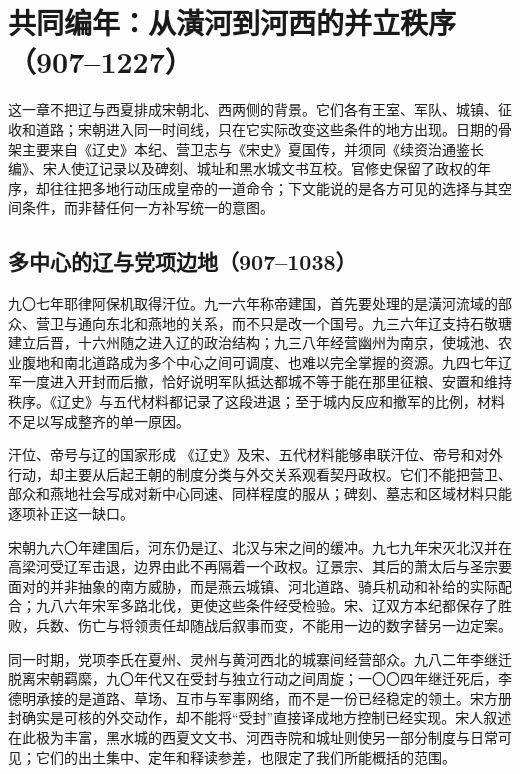 \section{共同编年：从潢河到河西的并立秩序（907--1227）}

这一章不把辽与西夏排成宋朝北、西两侧的背景。它们各有王室、军队、城镇、征收和道路；宋朝进入同一时间线，只在它实际改变这些条件的地方出现。日期的骨架主要来自《辽史》本纪、营卫志与《宋史》夏国传，并须同《续资治通鉴长编》、宋人使辽记录以及碑刻、城址和黑水城文书互校。官修史保留了政权的年序，却往往把多地行动压成皇帝的一道命令；下文能说的是各方可见的选择与其空间条件，而非替任何一方补写统一的意图。

\subsection{多中心的辽与党项边地（907--1038）}

九〇七年耶律阿保机取得汗位。九一六年称帝建国，首先要处理的是潢河流域的部众、营卫与通向东北和燕地的关系，而不只是改一个国号。九三六年辽支持石敬瑭建立后晋，十六州随之进入辽的政治结构；九三八年经营幽州为南京，使城池、农业腹地和南北道路成为多个中心之间可调度、也难以完全掌握的资源。九四七年辽军一度进入开封而后撤，恰好说明军队抵达都城不等于能在那里征粮、安置和维持秩序。《辽史》与五代材料都记录了这段进退；至于城内反应和撤军的比例，材料不足以写成整齐的单一原因。

\begin{debate}{汗位、帝号与辽的国家形成}
《辽史》及宋、五代材料能够串联汗位、帝号和对外行动，却主要从后起王朝的制度分类与外交关系观看契丹政权。它们不能把营卫、部众和燕地社会写成对新中心同速、同样程度的服从；碑刻、墓志和区域材料只能逐项补正这一缺口。
\end{debate}

宋朝九六〇年建国后，河东仍是辽、北汉与宋之间的缓冲。九七九年宋灭北汉并在高梁河受辽军击退，边界由此不再隔着一个政权。辽景宗、其后的萧太后与圣宗要面对的并非抽象的南方威胁，而是燕云城镇、河北道路、骑兵机动和补给的实际配合；九八六年宋军多路北伐，更使这些条件经受检验。宋、辽双方本纪都保存了胜败，兵数、伤亡与将领责任却随战后叙事而变，不能用一边的数字替另一边定案。

同一时期，党项李氏在夏州、灵州与黄河西北的城寨间经营部众。九八二年李继迁脱离宋朝羁縻，九〇年代又在受封与独立行动之间周旋；一〇〇四年继迁死后，李德明承接的是道路、草场、互市与军事网络，而不是一份已经稳定的领土。宋方册封确实是可核的外交动作，却不能将“受封”直接译成地方控制已经实现。宋人叙述在此极为丰富，黑水城的西夏文文书、河西寺院和城址则使另一部分制度与日常可见；它们的出土集中、定年和释读参差，也限定了我们所能概括的范围。

